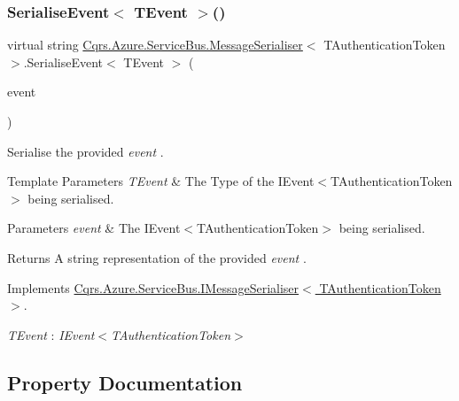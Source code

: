 \subsubsection{\texorpdfstring{Serialise\+Event$<$ T\+Event $>$()}{SerialiseEvent< TEvent >()}}
{\footnotesize\ttfamily virtual string \hyperlink{classCqrs_1_1Azure_1_1ServiceBus_1_1MessageSerialiser}{Cqrs.\+Azure.\+Service\+Bus.\+Message\+Serialiser}$<$ T\+Authentication\+Token $>$.Serialise\+Event$<$ T\+Event $>$ (\begin{DoxyParamCaption}\item[{T\+Event @}]{event }\end{DoxyParamCaption})\hspace{0.3cm}{\ttfamily [virtual]}}



Serialise the provided {\itshape event} . 


\begin{DoxyTemplParams}{Template Parameters}
{\em T\+Event} & The Type of the I\+Event$<$\+T\+Authentication\+Token$>$ being serialised.\\
\hline
\end{DoxyTemplParams}

\begin{DoxyParams}{Parameters}
{\em event} & The I\+Event$<$\+T\+Authentication\+Token$>$ being serialised.\\
\hline
\end{DoxyParams}
\begin{DoxyReturn}{Returns}
A string representation of the provided {\itshape event} .
\end{DoxyReturn}


Implements \hyperlink{interfaceCqrs_1_1Azure_1_1ServiceBus_1_1IMessageSerialiser_af6e1bca15164a08308969794b089c31b_af6e1bca15164a08308969794b089c31b}{Cqrs.\+Azure.\+Service\+Bus.\+I\+Message\+Serialiser$<$ T\+Authentication\+Token $>$}.

\begin{Desc}
\item[Type Constraints]\begin{description}
\item[{\em T\+Event} : {\em I\+Event$<$T\+Authentication\+Token$>$}]\end{description}
\end{Desc}


\subsection{Property Documentation}
\mbox{\label{classCqrs_1_1Azure_1_1ServiceBus_1_1MessageSerialiser_a71ebae2d4d6352b19b49bd0115b99fcf_a71ebae2d4d6352b19b49bd0115b99fcf}} 
